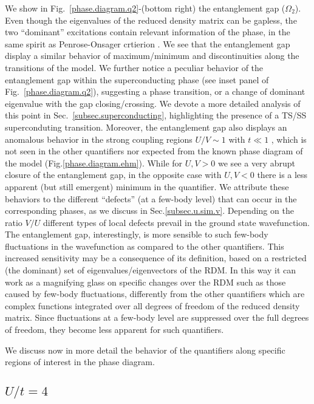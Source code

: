 \documentclass[prb,reprint,showpacs,twocolumn,superscriptaddress]{revtex4-2}
\begin{document}
We show in Fig.~\eqref{phase.diagram.q2}-(bottom right) the entanglement gap ($\Omega_2$).
Even though the eigenvalues of the reduced density matrix can be gapless, the two ``dominant'' excitations contain relevant information of the phase, 
in the same spirit as  Penrose-Onsager crtierion \cite{Shi2003,Patrycja2019}. 
We see that the entanglement gap 
display a similar behavior of maximum/minimum and discontinuities along the transitions of the model.  
We further notice a peculiar behavior of the entanglement gap within the superconducting phase (see inset panel of Fig.~\eqref{phase.diagram.q2}), suggesting a phase transition, or a change of dominant eigenvalue with the gap closing/crossing. We devote a more detailed analysis of this point 
in Sec.~\ref{subsec.superconducting}, highlighting the presence of a TS/SS superconduting transition. Moreover, the entanglement gap also displays an anomalous behavior in the strong coupling regions $U/V \sim 1$ with $t \ll 1$ , which is not seen in the other quantifiers nor expected from the known phase diagram of the model (Fig.\eqref{phase.diagram.ehm}). While for $U,V>0$ we see a very abrupt closure of the entanglement gap, in the opposite case with $U,V<0$ there is a less apparent (but still emergent) minimum in the quantifier. 
We attribute these behaviors  to the different ``defects'' (at a few-body level) that can occur in the corresponding phases, as we discuss  in  Sec.\eqref{subsec.u.sim.v}. Depending on the ratio $V/U$ different types of local defects prevail in the ground state wavefunction. 
The entanglement gap, interestingly, is more sensible to such few-body fluctuations in the wavefunction as compared to the other quantifiers. This increased sensitivity may be a  consequence of its definition, based on a restricted (the dominant) set of eigenvalues/eigenvectors of the RDM. In this way it can work as a magnifying glass on specific changes over the RDM such as those caused by few-body fluctuations, differently from the other quantifiers which are complex functions integrated over all degrees of freedom of the reduced density matrix. Since fluctuations at a few-body level are suppressed over the full degrees of freedom, they become less apparent for such quantifiers.

We discuss now in more detail the behavior of the quantifiers along specific regions of interest in the phase diagram.

\subsection{$U/t = 4$}
\end{document}
